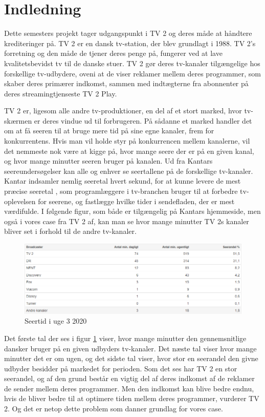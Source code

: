 \clearpage
\section{Indledning}
Dette semesters projekt tager udgangspunkt i TV 2 og deres måde at håndtere krediteringer på. TV 2 er en dansk tv-station, der blev grundlagt i 1988. TV 2's forretning og den måde de tjener deres penge på, fungerer ved at lave kvalitetsbevidst tv til de danske stuer. TV 2 gør deres tv-kanaler tilgængelige hos forskellige tv-udbydere, oveni at de viser reklamer mellem deres programmer, som skaber deres primærer indkomst, sammen med indtægterne fra abonnenter på deres streamingtjenseste TV 2 Play.

TV 2 er, ligesom alle andre tv-produktioner, en del af et stort marked, hvor tv-skærmen er deres vindue ud til forbrugeren. På sådanne et marked handler det om at få seeren til at bruge mere tid på sine egne kanaler, frem for konkurrentens. Hvis man vil holde styr på konkurrencen mellem kanalerne, vil det nemmeste nok være at kigge på, hvor mange seere der er på en given kanal, og hvor mange minutter seeren bruger på kanalen. Ud fra Kantars seereundersøgelser kan alle og enhver se seertallene på de forskellige tv-kanaler. Kantar indsamler nemlig seeretal hvert sekund, for at kunne levere de mest præcise seeretal \cite{url_kantar}, som programlæggere i tv-branchen bruger til at forbedre tv-oplevelsen for seerene, og fastlægge hvilke tider i sendefladen, der er mest værdifulde. I følgende figur, som både er tilgængelig på Kantars hjemmeside, men også i vores case fra TV 2 af, kan man se hvor mange minutter TV 2s kanaler bliver set i forhold til de andre tv-kanaler.
\begin{figure}[H]
    \centering
    \includegraphics[width=1\textwidth]{images/Seertal.png}
    \caption{Seertid i uge 3 2020}
    \label{fig:Seertid}
\end{figure}
Det første tal der ses i figur \ref{fig:Seertid} viser, hvor mange minutter den gennemsnitlige dansker bruger på en given udbyders tv-kanaler. Det næste tal viser hvor mange minutter det er om ugen, og det sidste tal viser, hvor stor en seerandel den givne udbyder besidder på markedet for perioden. 
Som det ses har TV 2 en stor seerandel, og af den grund består en vigtig del af deres indkomst af de reklamer de sender mellem deres programmer.  Men den indkomst kan blive bedre endnu, hvis de bliver bedre til at optimere tiden mellem deres programmer, vurderer TV 2. Og det er netop dette problem som danner grundlag for vores case.

